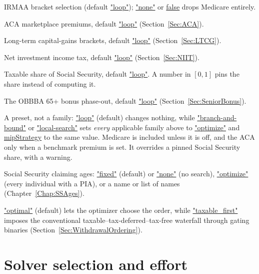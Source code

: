 \documentclass[fleqn,12pt]{report}
\newcommand{\code}[1]{\url{#1}}
\begin{document}
\begin{description}[style=nextline, leftmargin=1.5cm, font=\ttfamily]
\item[withMedicare]
IRMAA bracket selection (default \code{"loop"}); \code{"none"} or \code{false}
drops Medicare entirely.
\item[withACA]
ACA marketplace premiums, default \code{"loop"}
(Section~\ref{Sec:ACA}).
\item[withLTCG]
Long-term capital-gains brackets, default \code{"loop"}
(Section~\ref{Sec:LTCG}).
\item[withNIIT]
Net investment income tax, default \code{"loop"}
(Section~\ref{Sec:NIIT}).
\item[withSSTaxability]
Taxable share of Social Security, default \code{"loop"}.  A number in $[0,1]$
pins the share instead of computing it.
\item[withSeniorBonus]
The OBBBA 65+ bonus phase-out, default \code{"loop"}
(Section~\ref{Sec:SeniorBonus}).
\item[breakpointMethod]
A preset, not a family: \code{"loop"} (default) changes nothing, while
\code{"branch-and-bound"} or \code{"local-search"} sets \emph{every} applicable
family above to \code{"optimize"} and \code{mipStrategy} to the same value.
Medicare is included unless it is off, and the ACA only when a benchmark premium
is set.  It overrides a pinned Social Security share, with a warning.
\item[withSSAges]
Social Security claiming ages: \code{"fixed"} (default) or \code{"none"} (no
search), \code{"optimize"} (every individual with a PIA), or a name or list of
names (Chapter~\ref{Chap:SSAges}).
\item[withdrawalOrder]
\code{"optimal"} (default) lets the optimizer choose the order, while
\code{"taxable_first"} imposes the conventional
taxable--tax-deferred--tax-free waterfall through gating binaries
(Section~\ref{Sec:WithdrawalOrdering}).
\end{description}

\section{Solver selection and effort}
\end{document}
